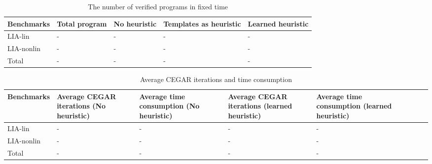 \documentclass{article}
\begin{document}
\begin{table}[h]
\begin{center}
\begin{tabular}{lp{2cm}p{2cm}p{3.5cm}p{3cm}}
\hline
Benchmarks  & Total program  & No heuristic & Templates as heuristic & Learned heuristic\\
\hline
LIA-lin    & - & -&-&-\\
LIA-nonlin & - & -&-&-\\
Total  & - & -&-&-\\
\hline
\end{tabular}\caption{The number of verified programs in fixed time}
\end{center}
\end{table}

\begin{table}[h]
\begin{center}
\begin{tabular}{lp{3cm}p{3cm}p{3cm}p{3cm}p{3cm}p{3cm}p{3cm} }
\hline
Benchmarks  & Average CEGAR iterations (No heuristic) & Average time consumption (No heuristic) & Average CEGAR iterations (learned heuristic) & Average time consumption (learned heuristic) \\
\hline
LIA-lin  & - & - & -&-\\
LIA-nonlin  & - & - & -&-\\
Total  & - & - & -&-\\
\hline
\end{tabular}\caption{Average CEGAR iterations and time consumption}
\end{center}
\end{table}
%
%
%
%
%
%
\end{document}
